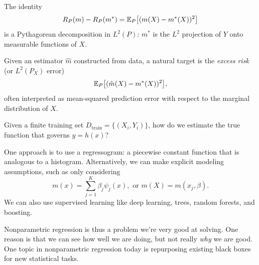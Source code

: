 \begin{remark}	The identity
	\[
		R_P(m)-R_P(m^*)=\mathbb{E}_P\big[(m(X)-m^*(X))^2\big]
	\]
	is a Pythagorean decomposition in $L^2(P)$: $m^*$ is the $L^2$ projection of $Y$ onto
	measurable functions of $X$.
\end{remark}

\begin{definition}
	Given an estimator $\hat m$ constructed from data, a natural target is the \emph{excess risk} (or $L^2(P_X)$ error)
	\[
		\mathbb{E}_P\big[(\hat m(X)-m^*(X))^2\big],
	\]
	often interpreted as mean-squared prediction error with respect to the marginal distribution of $X$.
\end{definition}

Given a finite training set $D_{\text{train}} = \{(X_i,Y_i)\}$, how do we estimate the true function that governs $y = h(x)$?

One approach is to use a regressogram: a piecewise constant function that is analogous to a histogram. Alternatively, we can make explicit modeling assumptions, such as only considering \[
	m(x) = \sum\limits_{j=1}^{K} \beta_j \psi_j(x), \text{ or } m(X) = m(x_j,\beta)
.\] 
We can also use supervised learning like deep learning, trees, random forests, and boosting. 

Nonparametric regression is thus a problem we're very good at solving. One reason is that we can see how well we are doing, but not really \emph{why} we are good. One topic in nonparametric regression today is repurposing existing black boxes for new statistical tasks.


